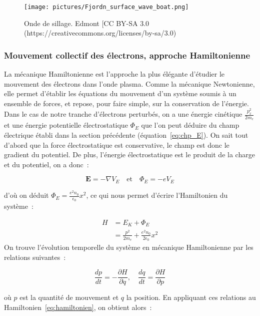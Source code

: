 \documentclass[a4paper]{book}
\begin{document}
\begin{figure}[!htbp]
\begin{center}
\texttt{[image: pictures/Fjordn\_surface\_wave\_boat.png]}
\end{center}
\caption{Onde de sillage. \textcopyleft Edmont [CC BY-SA 3.0 (https://creativecommons.org/licenses/by-sa/3.0) }
\label{fig:sillage}
\end{figure}



\subsubsection{Mouvement collectif des électrons, approche Hamiltonienne}

La mécanique Hamiltonienne est l'approche la plus élégante d'étudier le mouvement des électrons dans l'onde plasma. Comme la mécanique Newtonienne, elle permet d'établir les équations du mouvement d'un système soumis à un ensemble de forces, et repose, pour faire simple, sur la conservation de l'énergie. Dans le cas de notre tranche d'électrons perturbés, on a une énergie cinétique $\frac{p_x^2}{2m_e}$ et une énergie potentielle électrostatique $\Phi_E$ que l'on peut déduire du champ électrique établi dans la section précédente (équation~\ref{eq:chp_E}). On sait tout d'abord que la force électrostatique est conservative, le champ est donc le gradient du potentiel. De plus, l'énergie électrostatique est le produit de la charge et du potentiel, on a donc~:

\begin{equation}
    \textbf{E}=-\nabla V_E \quad \mathrm{et} \quad \Phi_E=-eV_E
\end{equation}

d'où on déduit $\Phi_E=\frac{e^2n_0}{\epsilon_0}x^2$, ce qui nous permet d'écrire l'Hamiltonien du système~:

\begin{align}
    H &= E_K + \Phi_E \\
      &= \frac{p^2}{2m_e}+\frac{e^2n_0}{2\epsilon_0}x^2
      \label{eq:hamiltonien}
\end{align}
On trouve l'évolution temporelle du système en mécanique Hamiltonienne par les relations suivantes~:

\begin{equation}
    \frac{dp}{dt}=-\frac{\partial H}{\partial q}, \quad \frac{dq}{dt}=\frac{\partial H}{\partial p}
\end{equation}

où $p$ est la quantité de mouvement et $q$ la position. En appliquant ces relations au Hamiltonien~\ref{eq:hamiltonien}, on obtient alors~:
\end{document}
